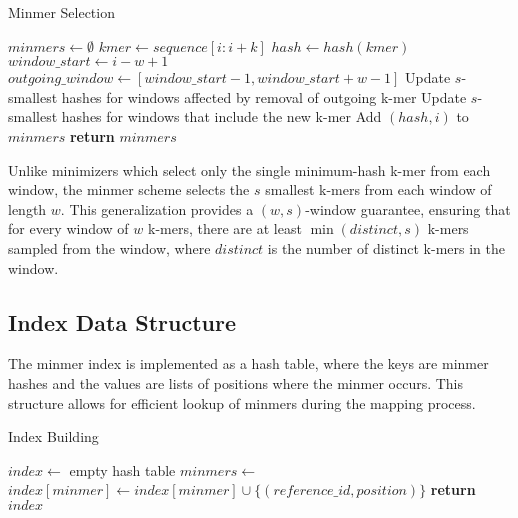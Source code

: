 \documentclass{article}
\begin{document}
\begin{algorithm}
\caption{Minmer Selection}
\begin{algorithmic}[1]
\State $minmers \gets \emptyset$
    \State $kmer \gets sequence[i:i+k]$
    \State $hash \gets hash(kmer)$
        \State $window\_start \gets i - w + 1$
        \State $outgoing\_window \gets [window\_start-1, window\_start+w-1]$
        \State Update $s$-smallest hashes for windows affected by removal of outgoing k-mer
    \EndIf
    \State Update $s$-smallest hashes for windows that include the new k-mer
            \State Add $(hash, i)$ to $minmers$
        \EndIf
    \EndFor
\EndFor
\State \textbf{return} $minmers$
\EndProcedure
\end{algorithmic}
\end{algorithm}

Unlike minimizers which select only the single minimum-hash k-mer from each window, the minmer scheme selects the $s$ smallest k-mers from each window of length $w$. This generalization provides a $(w,s)$-window guarantee, ensuring that for every window of $w$ k-mers, there are at least $\min(distinct, s)$ k-mers sampled from the window, where $distinct$ is the number of distinct k-mers in the window.

\subsection{Index Data Structure}

The minmer index is implemented as a hash table, where the keys are minmer hashes and the values are lists of positions where the minmer occurs. This structure allows for efficient lookup of minmers during the mapping process.

\begin{algorithm}
\caption{Index Building}
\begin{algorithmic}[1]
\State $index \gets$ empty hash table
    \State $minmers \gets$ 
        \State $index[minmer] \gets index[minmer] \cup \{(reference\_id, position)\}$
    \EndFor
\EndFor
\State \textbf{return} $index$
\EndProcedure
\end{algorithmic}
\end{algorithm}
\end{document}
